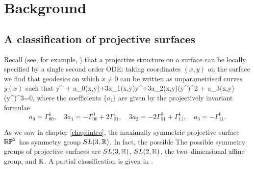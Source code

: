 \section{Background}
\label{sec:background}

\subsection{A classification of projective surfaces}
Recall (see, for example, \cite{BDE}) that a projective structure on a surface can be locally specified by a single second order ODE: taking coordinates $(x,y)$ on the surface we find that geodesics on which $\dot{x}\neq 0$ can be written as unparametrised curves $y(x)$ such that
\be
\label{odealice}
y^{\prime \prime} + a_0(x,y)+3a_1(x,y)y^{\prime}+3a_2(x,y)(y^{\prime})^2 + a_3(x,y)(y^\prime)^3=0,
\ee
where the coefficients $\{a_i\}$ are given by the projectively invariant formulae
\[
a_0=\Gamma^1_{00},\quad
3a_1=-\Gamma^0_{00}+2\Gamma^1_{01},\quad
3a_2=-2\Gamma^0_{01}+\Gamma^1_{11},\quad
a_3=-\Gamma^0_{11}.
\]

As we saw in chapter \ref{chap:intro}, the maximally symmetric projective surface $\mathbb{RP}^2$ has symmetry group $SL(3,\mathbb{R})$. In fact, the possible The possible symmetry groups of projective surfaces are $SL(3, \mathbb{R})$, $SL(2,\mathbb{R})$, the two--dimensional affine group, and $\mathbb{R}$. A partial classification is given in \cite{Bryant}.

